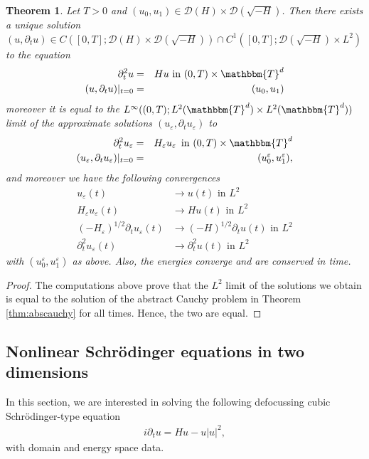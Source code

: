 \documentclass[11pt, oneside]{article}   	%
\newcommand{\tmem}[1]{{\em #1\/}}
\newcommand{\tmop}[1]{\ensuremath{\operatorname{#1}}}
\newtheorem{theorem}{Theorem}[section]
\begin{document}
\begin{theorem}
	Let $T > 0$ and  $(u_0, u_1) \in \mathscr{D} (H) \times \mathscr{D} (
	\sqrt{- {H}} )$. Then there exists a unique solution $(u,
	\partial_t u) \in C ( [0, T] ; \mathscr{D} (H) \times \mathscr{D}
	( \sqrt{- {H}} ) ) \cap C^1 ( [0, T] ;
	\mathscr{D} ( \sqrt{-{H}} ) \times L^2 )$ to the
	equation
	\begin{eqnarray*}
		\partial^2_t u & = & H u \ \text{in} \  (0, T) \times \mathbbm{T}^d\\
		(u, \partial_t u) |_{t = 0} & = & (u_0, u_1)
	\end{eqnarray*}
	moreover it is equal to the $L^{\infty} ((0, T) ; L^2 (\mathbbm{T}^d) \times
	L^2 (\mathbbm{T}^d))$ limit of the approximate solutions $(u_{\varepsilon},
	\partial_t u_{\varepsilon}) $ to \
	\begin{eqnarray*}
		\partial^2_t u_{\varepsilon} & = & H_{\varepsilon} u_{\varepsilon}
		\ \tmop{in} \  (0, T) \times \mathbbm{T}^d\\
		(u_{\varepsilon}, \partial_t u_{\varepsilon}) |_{t = 0} & = &
		(u^{\varepsilon}_0, u^{\varepsilon}_1),
	\end{eqnarray*}
and  moreover we have the following convergences		
\begin{align*}
u_{\varepsilon}(t)&\to u(t) \text{ in }L^2\\
H_\varepsilon u_{\varepsilon}(t) &\to H u(t) \text{ in }L^2\\
(-H_\varepsilon)^{1/2}\partial_tu_{\varepsilon}(t)&\to (-H)^{1/2}\partial_tu(t) \text{ in }L^2\\
\partial_t^2u_{\varepsilon}(t)&\to \partial^2_tu(t) \text{ in }L^2
\end{align*} 
	with $(u^{\varepsilon}_0, u^{\varepsilon}_1)$ as above. Also, the
	energies converge and are conserved in time.
\end{theorem}
\begin{proof}
	The computations above prove that the $L^2 $ limit of the solutions we
	obtain is equal to the solution of the abstract Cauchy problem in Theorem
	\ref{thm:abscauchy} for all times. Hence, the two are equal.{\tmem{}}
\end{proof}




\subsection{Nonlinear Schr\"odinger equations in two dimensions}
In this section,  we are interested in solving the following defocussing cubic Schr\"odinger-type equation
\begin{align}
i \partial_t u=H u-u|u|^2\label{eqn:2dnls},
\end{align}
with domain and energy space data.
\end{document}
